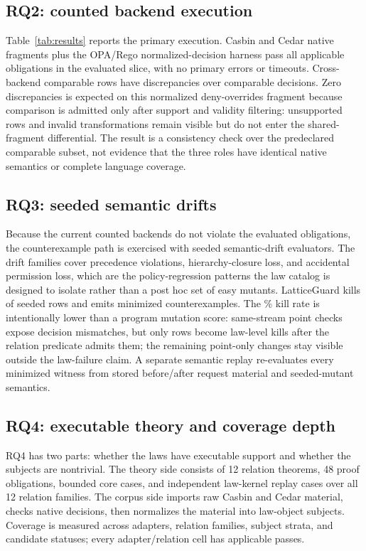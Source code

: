 \documentclass[10pt,conference]{IEEEtran}
\begin{document}
\subsection{RQ2: counted backend execution}
Table~\ref{tab:results} reports the primary execution.  Casbin and Cedar native fragments plus the OPA/Rego normalized-decision harness pass all \LGPrimaryObligations{} applicable obligations in the evaluated slice, with no primary errors or timeouts.  Cross-backend comparable rows have \LGCrossAdapterDiscrepancies{} discrepancies over \LGCrossAdapterComparable{} comparable decisions.  Zero discrepancies is expected on this normalized deny-overrides fragment because comparison is admitted only after support and validity filtering: \LGUnsupported{} unsupported rows and \LGRejected{} invalid transformations remain visible but do not enter the shared-fragment differential.  The result is a consistency check over the predeclared comparable subset, not evidence that the three roles have identical native semantics or complete language coverage.

\subsection{RQ3: seeded semantic drifts}
Because the current counted backends do not violate the evaluated obligations, the counterexample path is exercised with seeded semantic-drift evaluators.  The drift families cover precedence violations, hierarchy-closure loss, and accidental permission loss, which are the policy-regression patterns the law catalog is designed to isolate rather than a post hoc set of easy mutants.  LatticeGuard kills \LGSeededKilled{} of \LGSeededRows{} seeded rows and emits \LGCounterexamples{} minimized counterexamples.  The \LGSeededKillRate{}\% kill rate is intentionally lower than a program mutation score: same-stream point checks expose \LGSeededPointMismatches{} decision mismatches, but only \LGSeededHeadToHeadOverlap{} rows become law-level kills after the relation predicate admits them; the remaining point-only changes stay visible outside the law-failure claim.  A separate semantic replay re-evaluates every minimized witness from stored before/after request material and seeded-mutant semantics.

\subsection{RQ4: executable theory and coverage depth}
RQ4 has two parts: whether the laws have executable support and whether the subjects are nontrivial.  The theory side consists of 12 relation theorems, 48 proof obligations, \LGModelCheckCases{} bounded core cases, and \LGMechanizedKernelCases{} independent law-kernel replay cases over all 12 relation families.  The corpus side imports raw Casbin and Cedar material, checks native decisions, then normalizes the material into law-object subjects.  Coverage is measured across adapters, relation families, subject strata, and candidate statuses; every adapter/relation cell has applicable passes.
\end{document}
